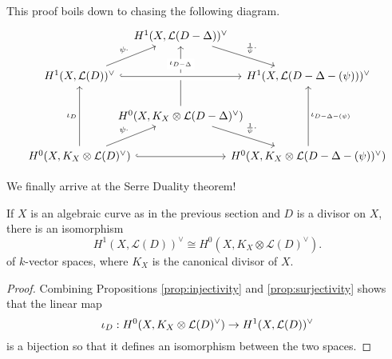 \begin{cat}
  This proof boils down to chasing the following diagram.
  \[\begin{tikzcd}[column sep=-2em]
    & {\dual{D-\Delta}} \\
    {\dual{D}} && {\dual{D-\Delta-(\psi)}} \\
    & {\diffs{D-\Delta}} \\
    {\diffs{D}} && {\diffs{D-\Delta-(\psi)}}
    \arrow["\psi\cdot", from=2-1, to=1-2]
    \arrow["{\frac1{\psi}\cdot}", from=1-2, to=2-3]
    \arrow["\iota_D", from=4-1, to=2-1]
    \arrow["{\iota_{D-\Delta}}"{description, pos=0.7}, from=3-2, to=1-2]
    \arrow["\iota_{D-\Delta-(\psi)}"', from=4-3, to=2-3]
    \arrow[hook, crossing over, from=2-1, to=2-3]
    \arrow[hook, from=4-1, to=4-3]
    \arrow["\psi\cdot", from=4-1, to=3-2]
    \arrow["{\frac1{\psi}\cdot}", from=3-2, to=4-3]
  \end{tikzcd}\]
\end{cat}

We finally arrive at the Serre Duality theorem!
\begin{thm}\label{thm:serre}
  If $X$ is an algebraic curve as in the previous section
  and $D$ is a divisor on $X$, there is an isomorphism
  \[
    H^{1}(X, \mathcal{L}(D))^{\vee}\cong H^{0}(X, K_{X}
    \otimes \mathcal{L}(D)^{\vee}).
  \]
  of $k$-vector spaces, where $K_{X}$ is the canonical divisor of $X$.
\end{thm}
\begin{proof}
  Combining Propositions \ref{prop:injectivity} and \ref{prop:surjectivity}
  shows that the linear map
  \[\iota_{D}:H^0(X,K_X\otimes\mathcal{L}(D)^{\vee})\to H^1(X,\mathcal{L}(D))^{\vee}\]
  is a bijection so that it defines an isomorphism between the two spaces.
\end{proof}
